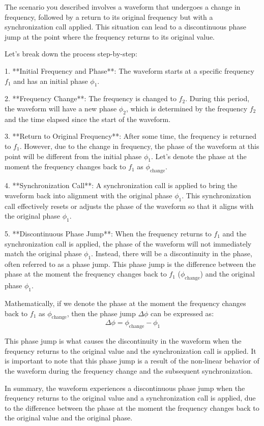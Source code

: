 The scenario you described involves a waveform that undergoes a change in frequency, followed by a return to its original frequency but with a synchronization call applied. This situation can lead to a discontinuous phase jump at the point where the frequency returns to its original value.

Let's break down the process step-by-step:

1. **Initial Frequency and Phase**: The waveform starts at a specific frequency \( f_1 \) and has an initial phase \( \phi_1 \).

2. **Frequency Change**: The frequency is changed to \( f_2 \). During this period, the waveform will have a new phase \( \phi_2 \), which is determined by the frequency \( f_2 \) and the time elapsed since the start of the waveform.

3. **Return to Original Frequency**: After some time, the frequency is returned to \( f_1 \). However, due to the change in frequency, the phase of the waveform at this point will be different from the initial phase \( \phi_1 \). Let's denote the phase at the moment the frequency changes back to \( f_1 \) as \( \phi_{\text{change}} \).

4. **Synchronization Call**: A synchronization call is applied to bring the waveform back into alignment with the original phase \( \phi_1 \). This synchronization call effectively resets or adjusts the phase of the waveform so that it aligns with the original phase \( \phi_1 \).

5. **Discontinuous Phase Jump**: When the frequency returns to \( f_1 \) and the synchronization call is applied, the phase of the waveform will not immediately match the original phase \( \phi_1 \). Instead, there will be a discontinuity in the phase, often referred to as a phase jump. This phase jump is the difference between the phase at the moment the frequency changes back to \( f_1 \) (\( \phi_{\text{change}} \)) and the original phase \( \phi_1 \).

Mathematically, if we denote the phase at the moment the frequency changes back to \( f_1 \) as \( \phi_{\text{change}} \), then the phase jump \( \Delta \phi \) can be expressed as:
\[ \Delta \phi = \phi_{\text{change}} - \phi_1 \]

This phase jump is what causes the discontinuity in the waveform when the frequency returns to the original value and the synchronization call is applied. It is important to note that this phase jump is a result of the non-linear behavior of the waveform during the frequency change and the subsequent synchronization.

In summary, the waveform experiences a discontinuous phase jump when the frequency returns to the original value and a synchronization call is applied, due to the difference between the phase at the moment the frequency changes back to the original value and the original phase.